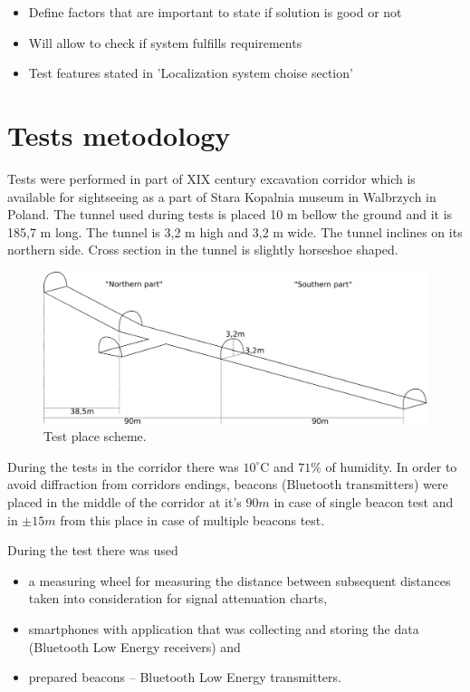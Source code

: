 \documentclass[../main.tex]{subfiles}
\begin{document}
\begin{itemize}
	\item Define factors that are important to state if solution is good or not
	\item Will allow to check if system fulfills requirements
	\item Test features stated in 'Localization system choise section'
\end{itemize}


\section{Tests metodology} %
\label{sec:tests_metodology}

Tests were performed in part of XIX century excavation corridor which is available for sightseeing as a part of Stara Kopalnia museum in Walbrzych in Poland. The tunnel used during tests is placed 10 m bellow the ground and it is 185,7 m long. The tunnel is 3,2 m high and 3,2 m wide.  The tunnel inclines on its northern side. Cross section in the tunnel is slightly horseshoe shaped.

\begin{figure}[!htbp]
\includegraphics[width=\textwidth, keepaspectratio]{pictures/corridor.pdf}
\centering
\caption{Test place scheme.}
\label{fig:corridor}
\end{figure}

During the tests in the corridor there was $10^\circ$C and $71 \%$ of humidity. In order to avoid diffraction from corridors endings, beacons (Bluetooth transmitters) were placed in the middle of the corridor at it's $90 m$ in case of single beacon test and in $\pm15 m$ from this place in case of multiple beacons test.

During the test there was used
\begin{itemize}
	\item a measuring wheel for measuring the distance between subsequent distances taken into consideration for signal attenuation charts,
	\item smartphones with application that was collecting and storing the data (Bluetooth Low Energy receivers) and
	\item prepared beacons -- Bluetooth Low Energy transmitters.
\end{itemize}
\end{document}
